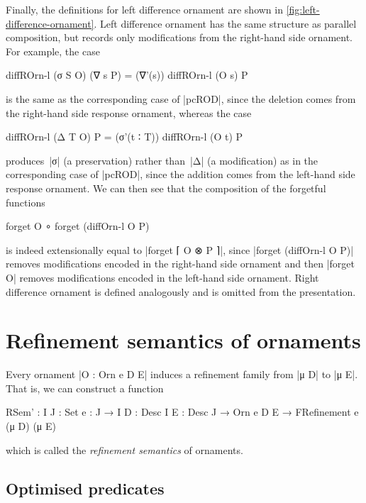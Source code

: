 Finally, the definitions for left difference ornament are shown in \autoref{fig:left-difference-ornament}.
Left difference ornament has the same structure as parallel composition, but records only modifications from the right-hand side ornament.
For example, the case
\begin{code}
diffROrn-l (σ S O) (∇ s P) = (∇'(s)) diffROrn-l (O s) P
\end{code}
is the same as the corresponding case of |pcROD|, since the deletion comes from the right-hand side response ornament, whereas the case
\begin{code}
diffROrn-l (Δ T O) P = (σ'(t ∶ T)) diffROrn-l (O t) P
\end{code}
produces~|σ| (a preservation) rather than~|Δ| (a modification) as in the corresponding case of |pcROD|, since the addition comes from the left-hand side response ornament.
We can then see that the composition of the forgetful functions
\begin{code}
forget O ∘ forget (diffOrn-l  O P)
\end{code}
is indeed extensionally equal to |forget ⌈ O ⊗ P ⌉|, since |forget (diffOrn-l O P)| removes modifications encoded in the right-hand side ornament and then |forget O| removes modifications encoded in the left-hand side ornament.
Right difference ornament is defined analogously and is omitted from the presentation.

\section{Refinement semantics of ornaments}
\label{sec:refinement-semantics}

Every ornament |O : Orn e D E| induces a refinement family from |μ D| to |μ E|.
That is, we can construct a function
\begin{code}
RSem' :  {I J : Set} {e : J → I} {D : Desc I} {E : Desc J} →
         Orn e D E → FRefinement e (μ D) (μ E)
\end{code}
which is called the \emph{refinement semantics} of ornaments.


\subsection{Optimised predicates}
\label{sec:optimised-predicates}

